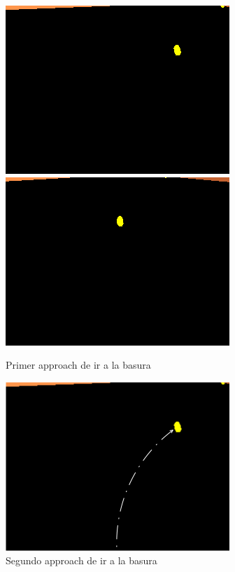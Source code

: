 \begin{figure}[htp]
\begin{center}
\includegraphics[scale=0.5]{comportamientos/basura.png}
\includegraphics[scale=0.5]{comportamientos/basuraenfocada.png}
\caption{Primer approach de ir a la basura}
\label{fig:papproachgoto}
\end{center}
\end{figure}

\begin{figure}[htp]
\begin{center}
\includegraphics[scale=0.5]{comportamientos/basuraAlt.png}
\caption{Segundo approach de ir a la basura}
\label{fig:sapproachgoto}
\end{center}
\end{figure}

